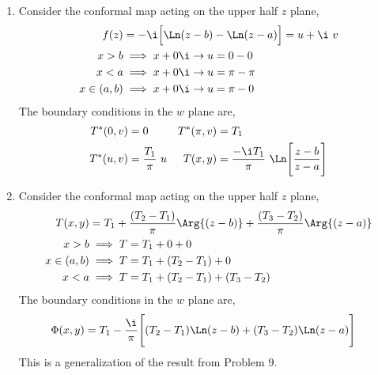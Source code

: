 \begin{enumerate}
    \item Consider the conformal map acting on the upper half $ z $ plane,
          \begin{align}
              f(z)         & = -\i \Big[\Ln(z-b) - \Ln(z-a)\Big] = u + \i\ v \\
              x > b        & \implies x + 0\i \to u = 0 - 0                  \\
              x < a        & \implies x + 0\i \to u = \pi - \pi              \\
              x \in (a, b) & \implies x + 0\i \to u = \pi - 0
          \end{align}
          The boundary conditions in the $ w $ plane are,
          \begin{align}
              T^*(0, v)   & = 0                                                   &
              T^*(\pi, v) & = T_1                                                   \\
              T^*(u, v)   & = \frac{T_1}{\pi}\ u                                  &
              T(x, y)     & = \frac{-\i T_1}{\pi}\ \Ln\Bigg[\frac{z-b}{z-a}\Bigg]
          \end{align}

    \item Consider the conformal map acting on the upper half $ z $ plane,
          \begin{align}
              T(x, y)      & = T_1 + \frac{(T_2 - T_1)}{\pi} \Arg{(z - b)}
              + \frac{(T_3 - T_2)}{\pi} \Arg{(z-a)}                        \\
              x > b        & \implies T = T_1 + 0 + 0                      \\
              x \in (a, b) & \implies T = T_1 + (T_2 - T_1) + 0            \\
              x < a        & \implies T = T_1 + (T_2 - T_1) + (T_3 - T_2)
          \end{align}
          The boundary conditions in the $ w $ plane are,
          \begin{align}
              \Phi(x, y) & = T_1 - \frac{\i}{\pi} \Bigg[ (T_2 - T_1)\Ln(z-b)
                  + (T_3 - T_2)\Ln(z-a) \Bigg]
          \end{align}
          This is a generalization of the result from Problem $ 9 $.


\end{enumerate}
